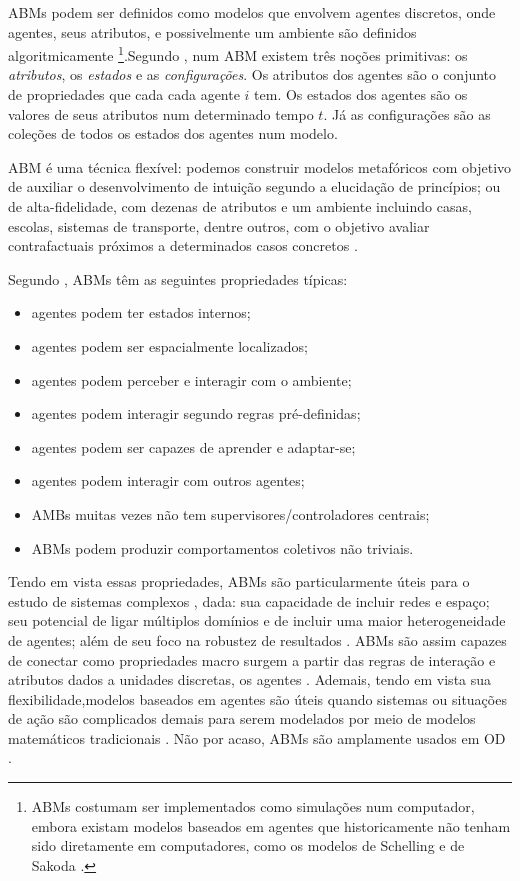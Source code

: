 ABMs podem ser definidos como modelos que envolvem agentes discretos, onde
agentes, seus atributos, e possivelmente um ambiente são definidos
algoritmicamente \cite{sayama2015introduction} \footnote{ ABMs costumam ser
  implementados como simulações num computador, embora existam modelos baseados
  em agentes que historicamente não tenham sido diretamente em computadores,
  como os modelos de Schelling e de Sakoda \cite{hegselmann2017thomas}.}.Segundo
, num ABM existem três noções primitivas: os
\textit{atributos}, os \textit{estados} e as \textit{configurações}. Os
atributos dos agentes são o conjunto de propriedades que cada cada agente \(i\)
tem. Os estados dos agentes são os valores de seus atributos num determinado
tempo \(t\). Já as configurações são as coleções de todos os estados dos agentes
num modelo.

ABM é uma técnica flexível: podemos construir modelos metafóricos com
objetivo de auxiliar o desenvolvimento de intuição segundo a elucidação de
princípios; ou de alta-fidelidade, com dezenas de atributos e um
ambiente incluindo casas, escolas, sistemas de transporte, dentre outros, com o
objetivo avaliar contrafactuais próximos a determinados casos concretos
\cite{de2014agent, epstein2006generative}.


Segundo , ABMs têm as seguintes
propriedades típicas:
\begin{itemize}
\item agentes podem ter estados internos;
\item agentes podem ser espacialmente localizados;
\item agentes podem perceber e interagir com o ambiente;
\item agentes podem interagir segundo regras pré-definidas;
\item agentes podem ser capazes de aprender e adaptar-se;
\item agentes podem interagir com outros agentes;
\item AMBs muitas vezes não tem supervisores/controladores centrais;
  \item ABMs podem produzir comportamentos coletivos não triviais.
  \end{itemize}

  Tendo em vista essas propriedades, ABMs são particularmente úteis para o
  estudo de sistemas complexos \cite{wilensky2015introduction}, dada: sua
  capacidade de incluir redes e espaço; seu potencial de ligar múltiplos
  domínios e de incluir uma maior heterogeneidade de agentes; além de seu foco
  na robustez de resultados \cite{de2014agent,wilensky2015introduction}. ABMs
  são assim capazes de conectar como propriedades macro surgem a partir das
  regras de interação e atributos dados a unidades discretas, os agentes
  \cite{north2007managing}. Ademais, tendo em vista sua flexibilidade,modelos
  baseados em agentes são úteis quando sistemas ou situações de ação são
  complicados demais para serem modelados por meio de modelos matemáticos
  tradicionais \cite{kollman2003computational}. Não por acaso, ABMs são
  amplamente usados em OD \cite{castellano2012social,flache2017}.

